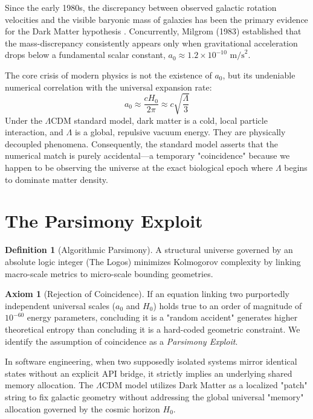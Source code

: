 \documentclass[12pt, a4paper]{article}
\theoremstyle{plain}
\theoremstyle{definition}
\newtheorem{definition}[theorem]{Definition}
\newtheorem{axiom}[theorem]{Axiom}
\theoremstyle{remark}
\begin{document}
Since the early 1980s, the discrepancy between observed galactic rotation velocities and the visible baryonic mass of galaxies has been the primary evidence for the Dark Matter hypothesis \citep{Rubin1980}. Concurrently, Milgrom (1983) established that the mass-discrepancy consistently appears only when gravitational acceleration drops below a fundamental scalar constant, $a_0 \approx 1.2 \times 10^{-10} \text{ m/s}^2$. 

The core crisis of modern physics is not the existence of $a_0$, but its undeniable numerical correlation with the universal expansion rate:
\begin{equation}
    a_0 \approx \frac{c H_0}{2 \pi} \approx c \sqrt{\frac{\Lambda}{3}}
\end{equation}
Under the $\Lambda$CDM standard model, dark matter is a cold, local particle interaction, and $\Lambda$ is a global, repulsive vacuum energy. They are physically decoupled phenomena. Consequently, the standard model asserts that the numerical match is purely accidental---a temporary "coincidence" because we happen to be observing the universe at the exact biological epoch where $\Lambda$ begins to dominate matter density.

\section{The Parsimony Exploit}\label{sec:exploit}

\begin{definition}[Algorithmic Parsimony]
A structural universe governed by an absolute logic integer (The Logos) minimizes Kolmogorov complexity by linking macro-scale metrics to micro-scale bounding geometries.
\end{definition}

\begin{axiom}[Rejection of Coincidence]
If an equation linking two purportedly independent universal scales ($a_0$ and $H_0$) holds true to an order of magnitude of $10^{-60}$ energy parameters, concluding it is a "random accident" generates higher theoretical entropy than concluding it is a hard-coded geometric constraint. We identify the assumption of coincidence as a \emph{Parsimony Exploit}.
\end{axiom}

In software engineering, when two supposedly isolated systems mirror identical states without an explicit API bridge, it strictly implies an underlying shared memory allocation. The $\Lambda$CDM model utilizes Dark Matter as a localized "patch" string to fix galactic geometry without addressing the global universal "memory" allocation governed by the cosmic horizon $H_0$.
\end{document}
